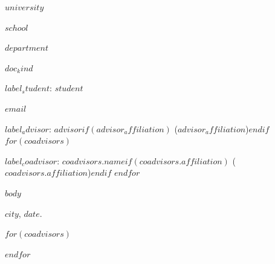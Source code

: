 \documentclass[a4paper,12pt,oneside,openany]{report}
\begin{document}
\begin{center}
\textbf{$university$}
\vspace{-0.2cm}

\textbf{$school$}
\vspace{-0.2cm}

\textbf{$department$}
\vspace{0.8cm}

\underline{\textbf{$doc_kind$}}

$label_student$: $student$
\vspace{-0.2cm}

$email$

$label_advisor$: $advisor$$if(advisor_affiliation)$ ($advisor_affiliation$)$endif$
$for(coadvisors)$
\vspace{-0.2cm}

$label_coadvisor$: $coadvisors.name$$if(coadvisors.affiliation)$ ($coadvisors.affiliation$)$endif$
$endfor$
\end{center}

$body$

      \vspace{1cm}
      \noindent
$city$, $date$.

      \vspace{0.5cm}
      \begin{flushright}
         \parbox{10cm}{
            \hrulefill

            \vspace{-.375cm}

            \vspace{0.9cm}
            \hrulefill

            \vspace{-.375cm}

$for(coadvisors)$
            \vspace{0.9cm}
            \hrulefill

            \vspace{-.375cm}

$endfor$
         }
      \end{flushright}
      \vfill
\end{document}
